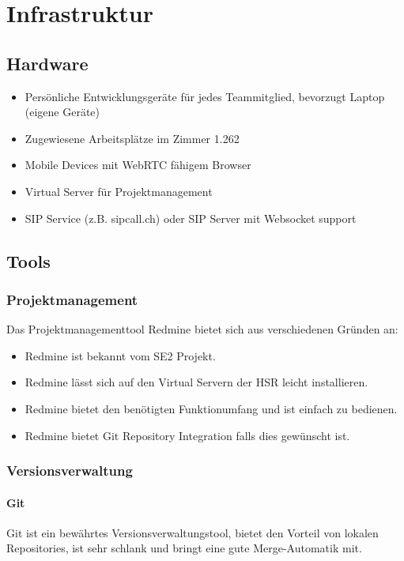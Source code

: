 \chapter{Infrastruktur}

\section{Hardware}
\begin{itemize}
	\setlength{\itemsep}{-\parsep}
	\item Persönliche Entwicklungsgeräte für jedes Teammitglied, bevorzugt Laptop (eigene Geräte)
	\item Zugewiesene Arbeitsplätze im Zimmer 1.262
	\item Mobile Devices mit WebRTC fähigem Browser
	\item Virtual Server für Projektmanagement
	\item SIP Service (z.B. sipcall.ch) oder SIP Server mit Websocket support
\end{itemize}

\section{Tools}
\subsection{Projektmanagement}
Das Projektmanagementtool Redmine bietet sich aus verschiedenen Gründen an:
\begin{itemize}
	\setlength{\itemsep}{-\parsep}
	\item Redmine ist bekannt vom SE2 Projekt.
	\item Redmine lässt sich auf den Virtual Servern der HSR leicht installieren.
	\item Redmine bietet den benötigten Funktionumfang und ist einfach zu bedienen.
	\item Redmine bietet Git Repository Integration falls dies gewünscht ist.
\end{itemize}


\subsection{Versionsverwaltung}
\subsubsection{Git}
Git ist ein bewährtes Versionsverwaltungstool, bietet den Vorteil von lokalen Repositories, ist sehr schlank und bringt eine gute Merge-Automatik mit.

